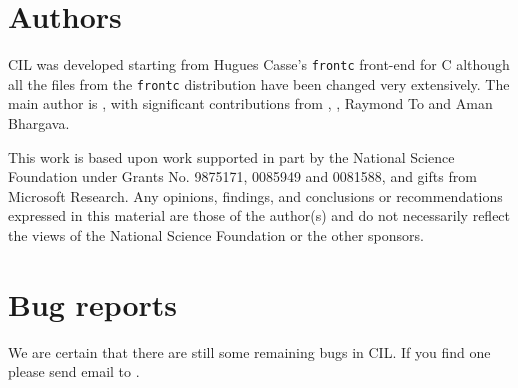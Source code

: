 \documentclass{article}
\def\t#1{{\tt #1}}
\begin{document}
\section{Authors}

 CIL was developed starting from Hugues Casse's \t{frontc} front-end for C
although all the files from the \t{frontc} distribution have been changed very
extensively. The main author is , with significant contributions from
,
, Raymond To and Aman
Bhargava.

 This work is based upon work supported in part by the National Science
Foundation under Grants No. 9875171, 0085949 and 0081588, and gifts from
Microsoft Research. Any opinions, findings, and conclusions or recommendations
expressed in this material are those of the author(s) and do not necessarily
reflect the views of the National Science Foundation or the other sponsors.

\section{Bug reports}
 
 We are certain that there are still some remaining bugs in CIL. If you find
one please send email to .  
\end{document}
